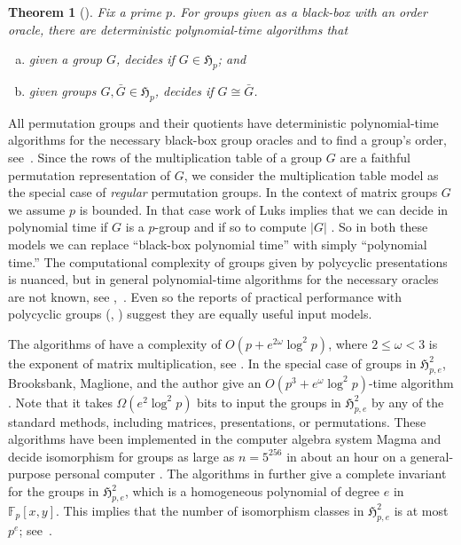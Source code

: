 \documentclass{toc}
\numberwithin{equation}{section}
\theoremstyle{plain}       %
\newtheorem{thm}[equation]{Theorem}
\theoremstyle{remark}
\theoremstyle{definition}
\numberwithin{figure}{section}
\numberwithin{table}{section}
\newcommand{\mygroups}{\mathfrak{H}}
\newcommand{\bbF}{\mathbb{F}}  %
\begin{document}
\begin{thm}[\cite{LW}]\label{thm:algo}
Fix a prime $p$.  For groups given as a black-box with an order oracle, there are deterministic polynomial-time algorithms that
\begin{enumerate}[(a)]
\item given a group $G$, decides if $G\in\mygroups_p$; and 
\item given groups $G,\bar{G}\in \mygroups_p$, decides if $G\cong \bar{G}$.
\end{enumerate}
\end{thm}

All permutation groups and their quotients have deterministic polynomial-time
algorithms for the necessary black-box group oracles and to find a group's
order,
%
see~\cite[Chapter 3]{Seress}.    %
Since the rows of the multiplication table
of a group $G$ are a faithful permutation representation of $G$, 
we consider the
multiplication table model as the special case of \emph{regular} permutation
groups. In the context of matrix groups $G$ we assume $p$ is bounded.  In that
case work of Luks implies that we can decide in polynomial time if $G$ is a
$p$-group and if so to compute $|G|$ \cite{Luks:solv-mat}.  So in both these
models we can replace ``black-box polynomial time'' with simply ``polynomial
time.'' The computational complexity of groups given by polycyclic presentations
is nuanced, but in general polynomial-time algorithms for the necessary oracles
are not known, see \cite[Section~4]{collection},~\cite{deep-thought}. Even so
the reports of practical performance with polycyclic groups (\eg,
\cite[Section~7.2]{Seress}) suggest they are equally useful input models.

The algorithms of \cite{LW} have a complexity of $O(p+e^{2\omega}\log^2 p)$,
where $2\leq \omega<3$ is the exponent of matrix multiplication, see
\cite[Chapter~12]{vzG}. In the special case of groups in $\mygroups_{p,e}^{2}$,
Brooksbank, Maglione, and the author give an $O(p^3+e^{\omega}\log^2 p)$-time
algorithm \cite{BMW}.  Note that it takes $\Omega(e^2\log^2 p)$ bits to input
the groups in $\mygroups_{p,e}^{2}$ by any of the standard methods, including
matrices, presentations, or permutations.  These algorithms  have been
implemented in the computer algebra system \textsf{Magma} \cite{Magma} and
decide isomorphism for groups as large as $n=5^{256}$ in about an hour on a
general-purpose personal computer \cite[Figure~1.1]{BMW}. The algorithms in
\cite{BMW} further give a complete invariant for the groups in
$\mygroups_{p,e}^{2}$, which is a homogeneous polynomial of degree $e$ in
$\bbF_p[x,y]$.  This implies that the number of isomorphism classes in
$\mygroups_{p,e}^{2}$ is at most $p^{e}$; 
%
see~\cite[Proposition~9.2]{BMW}.    %
\medskip
\end{document}

